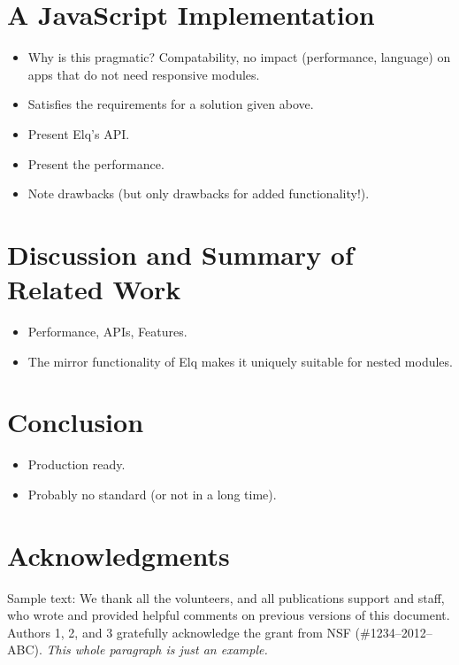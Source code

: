 \documentclass{sigchi}
\begin{document}
\section{A JavaScript Implementation}
  \begin{itemize}
    \item Why is this pragmatic? Compatability, no impact (performance, language) on apps that do not need responsive modules.
    \item Satisfies the requirements for a solution given above.
    \item Present Elq's API.
    \item Present the performance.
    \item Note drawbacks (but only drawbacks for added functionality!).
  \end{itemize}

\section{Discussion and Summary of Related Work}
  \begin{itemize}
    \item Performance, APIs, Features.
    \item The mirror functionality of Elq makes it uniquely suitable for nested modules.
  \end{itemize}

\section{Conclusion}
  \begin{itemize}
    \item Production ready.
    \item Probably no standard (or not in a long time).
  \end{itemize}

\section{Acknowledgments}

Sample text: We thank all the volunteers, and all publications support
and staff, who wrote and provided helpful comments on previous
versions of this document. Authors 1, 2, and 3 gratefully acknowledge
the grant from NSF (\#1234--2012--ABC). \textit{This whole paragraph is
  just an example.}

%
%
%
%
%



\end{document}
